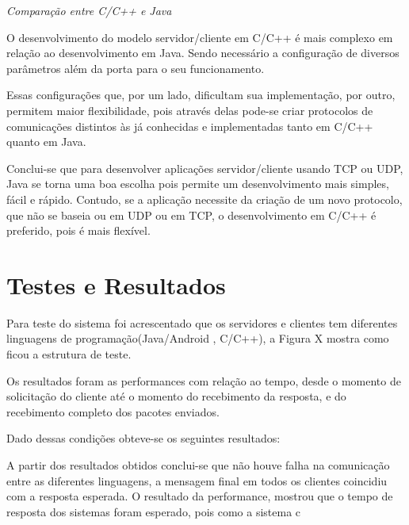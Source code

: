 \documentclass[12pt,a4paper]{article}
\begin{document}
\textit{\Large{Comparação entre C/C++ e Java}}

O desenvolvimento do modelo servidor/cliente em C/C++ é mais complexo em relação ao desenvolvimento em Java. Sendo necessário a configuração de diversos parâmetros além da porta para o seu funcionamento.

Essas configurações que, por um lado, dificultam sua implementação, por outro, permitem maior flexibilidade, pois através delas pode-se criar protocolos de comunicações distintos às já conhecidas e implementadas tanto em C/C++ quanto em Java.

Conclui-se que para desenvolver aplicações servidor/cliente usando TCP ou UDP, Java se torna uma boa escolha pois permite um desenvolvimento mais simples, fácil e rápido. Contudo, se a aplicação necessite da criação de um novo protocolo, que não se baseia ou em UDP ou em TCP, o desenvolvimento em C/C++ é preferido, pois é mais flexível.
\newpage
\section{Testes e Resultados}
Para teste do sistema foi acrescentado que os servidores e clientes tem diferentes linguagens de programação(Java/Android , C/C++), a Figura X mostra como ficou a estrutura de teste.

Os resultados foram as performances com relação ao tempo, desde o momento de solicitação do cliente até o momento do recebimento da resposta, e do recebimento completo dos pacotes enviados.

Dado dessas condições obteve-se os seguintes resultados:


A partir dos resultados obtidos conclui-se que não houve falha na comunicação entre as diferentes linguagens, a mensagem final em todos os clientes coincidiu com a resposta esperada.
O resultado da performance, mostrou que o tempo de resposta dos sistemas foram esperado, pois como a sistema c
\end{document}
